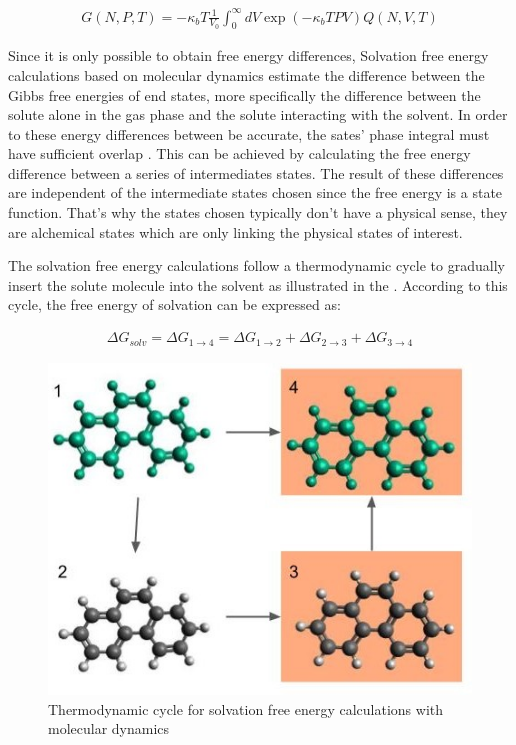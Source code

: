 \begin{equation}
\label{eq:fisobari}
\begin{aligned}
G(N,P,T) = -\kappa_{b}T\frac{1}{V_{0}} \int_{0}^{\infty} dV \exp(-\kappa_{b}TPV)Q(N,V,T)
\end{aligned}
\end{equation}

Since it is only possible to obtain free energy differences, Solvation free energy calculations based on molecular dynamics estimate the difference between the Gibbs free energies of end states, more specifically the difference between the solute alone in the gas phase and the solute interacting with the solvent. In order to these energy differences between be accurate, the sates' phase integral must have sufficient overlap  \cite{klimovich}. This can be achieved by calculating the free energy difference between a series of intermediates states. The result of these differences are independent of the intermediate states chosen since the free energy is a state function. That's why the states chosen typically don't have a physical sense, they are alchemical states which are only linking the physical states of interest.

The solvation free energy calculations follow a thermodynamic cycle to gradually insert the solute molecule into the solvent as illustrated in the . According to this cycle, the free energy of solvation can be expressed as:

\begin{equation}
\label{eq:freesolv}
\begin{aligned}
\Delta G_{solv} = \Delta G_{1 \rightarrow 4} = \Delta G_{1 \rightarrow 2} + \Delta G_{2 \rightarrow 3} + \Delta G_{3 \rightarrow 4}  
\end{aligned}
\end{equation}


\begin{figure}[th]
\centering
\includegraphics[scale=0.6]{Figures/cicclotermo.jpg}
\caption{Thermodynamic cycle for solvation free energy calculations with molecular dynamics \cite{klimovich}}
\label{thermcy}
\end{figure}

